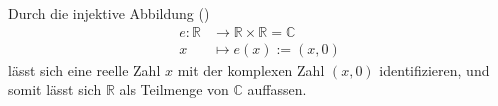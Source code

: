 Durch die injektive Abbildung ()
\begin{align*}
    e : \mathbb{R} & \longrightarrow \mathbb{R} \times \mathbb{R} = \mathbb{C} \\
    x & \longmapsto e(x) := (x, 0)
\end{align*}
lässt sich eine reelle Zahl $x$ mit der komplexen Zahl $(x, 0)$ identifizieren, und somit lässt sich $\mathbb{R}$ als Teilmenge von $\mathbb{C}$ auffassen.